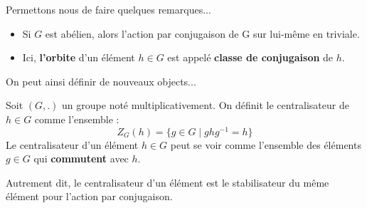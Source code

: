 \begin{remark}
	Permettons nous de faire quelques remarques...
	\begin{itemize}
		\item Si $G$ est abélien, alors l'action par conjugaison de G sur lui-même en triviale. 
		\item Ici, \textbf{l'orbite} d'un élément $h \in G$ est appelé \textbf{classe de conjugaison} de $h$. 
	\end{itemize}
\end{remark}

On peut ainsi définir de nouveaux objects... 

\begin{definition}[Centralisateur]
	Soit $(G,.)$ un groupe noté multiplicativement. On définit le centralisateur de $h \in G$ comme l'ensemble :
		\[ Z_G(h) = \{g \in G \; | \; ghg^{-1} = h\} \] 
	Le centralisateur d'un élément $h \in G$ peut se voir comme l'ensemble des éléments $g \in G$ qui \textbf{commutent} avec $h$.
	
	\vspace{0.3cm}

	Autrement dit, le centralisateur d'un élément est le stabilisateur du même élément pour l'action par conjugaison. 
\end{definition}